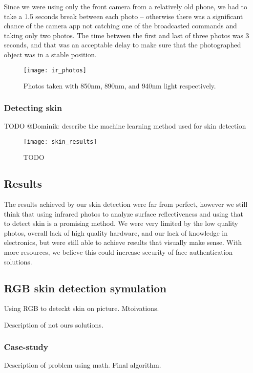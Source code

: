             Since we were using only the front camera from a relatively old phone,
            we had to take a 1.5 seconds break between each photo -- otherwise
            there was a significant chance of the camera app not catching one of the
            broadcasted commands and taking only two photos.
            The time between the first and last of three photos was 3 seconds,
            and that was an acceptable delay to make sure that the photographed
            object was in a stable position.

            \begin{figure}[H]
                \caption{Photos taken with 850nm, 890nm, and 940nm light respectively.}
                \centering
                \texttt{[image: ir\_photos]}
                \label{fig:ir_photos}
            \end{figure}

            \subsubsection*{Detecting skin}
            TODO @Dominik: describe the machine learning method used for skin detection

            \begin{figure}[H]
                \caption{TODO}
                \centering
                \texttt{[image: skin\_results]}
                \label{fig:skin_results}
            \end{figure}

    \subsection{Results}
        The results achieved by our skin detection were far from perfect,
        however we still think that using infrared photos to analyze surface
        reflectiveness and using that to detect skin is a promising method.
        We were very limited by the low quality photos, overall lack of
        high quality hardware, and our lack of knowledge in electronics,
        but were still able to achieve results that visually make sense.
        With more resources, we believe this could increase security of
        face authentication solutions.

    \subsection{RGB skin detection symulation}
        Using RGB to deteckt skin on picture.
        Mtoivations.

        Description of not ours solutions.

        \subsubsection*{Case-study}
            Description of problem using math.
            Final algorithm.
